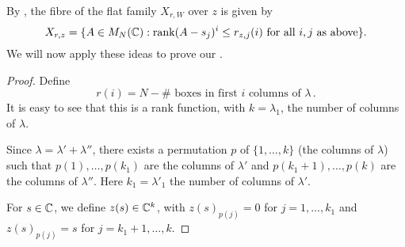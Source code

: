 \documentclass[draft]{article}
\begin{document}
% 
By \cite[Corollary 2.2]{eisenbud1989rank}, the fibre of the flat family $ X_{r,W} $ over $ z$ is given by
\begin{equation} 
    \label{eq:ESfibre}
    X_{r,z} = \{ A \in M_N(\mathbb C) :\operatorname{rank} (A-s_j)^i\le r_{z,j}(i) \text{ for all } i , j \text{ as above}\}.
\end{equation}
% 
We will now apply these ideas to prove our .
% 
\begin{proof}
% 
% 
Define 
$$
    r(i) = N - \#\text{~boxes in first $i$ columns of }\lambda\,.
$$
It is easy to see that this is a rank function, with $ k = \lambda_1$, the number of columns of $ \lambda$.

Since $\lambda = \lambda' + \lambda''$, there exists a permutation $ p $ of $ \{1, \dots, k\}$ (the columns of $ \lambda$) such that $ p(1), \dots, p(k_1) $ are the columns of $ \lambda'$ and $ p(k_1+1), \dots, p(k)$ are the columns of $ \lambda''$. Here $ k_1 = \lambda'_1$ the number of columns of $ \lambda'$.

For $ s \in \mathbb C$, we define $ z(s) \in \mathbb C^k$, with $ z(s)_{p(j)} = 0 $ for $ j = 1, \dots, k_1 $ and $ z(s)_{p(j)} = s $ for $ j = k_1 + 1, \dots, k$.


\end{proof}
\end{document}
